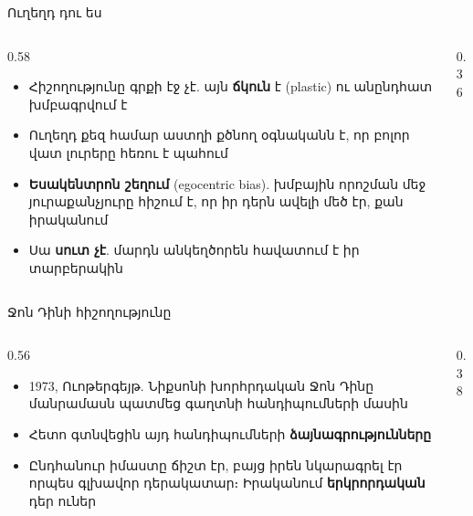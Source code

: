 
\begin{frame}{Ուղեղդ դու ես}
  \begin{columns}[c]
    \begin{column}{0.58\textwidth}
      \begin{itemize}
        \item Հիշողությունը գրքի էջ չէ. այն \textbf{ճկուն} է (plastic) ու անընդհատ խմբագրվում է
        \item Ուղեղդ քեզ համար աստղի քծնող օգնականն է, որ բոլոր վատ լուրերը հեռու է պահում
        \item<2-> \textbf{Եսակենտրոն շեղում} (egocentric bias). խմբային որոշման մեջ յուրաքանչյուրը հիշում է, որ իր դերն ավելի մեծ էր, քան իրականում
        \item<3-> Սա \textbf{սուտ չէ}. մարդն անկեղծորեն հավատում է իր տարբերակին
      \end{itemize}
    \end{column}
    \begin{column}{0.36\textwidth}
      \centering{}
    \end{column}
  \end{columns}
\end{frame}

\begin{frame}{Ջոն Դինի հիշողությունը}
  \begin{columns}[c]
    \begin{column}{0.56\textwidth}
      \begin{itemize}
        \item 1973, Ուոթերգեյթ. Նիքսոնի խորհրդական Ջոն Դինը մանրամասն պատմեց գաղտնի հանդիպումների մասին
        \item<2-> Հետո գտնվեցին այդ հանդիպումների \textbf{ձայնագրությունները} 
        \item<3-> Ընդհանուր իմաստը ճիշտ էր, բայց իրեն նկարագրել էր որպես գլխավոր դերակատար։ Իրականում \textbf{երկրորդական} դեր ուներ
      \end{itemize}
    \end{column}
    \begin{column}{0.38\textwidth}
      \centering
      \par\medskip
    \end{column}
  \end{columns}
\end{frame}


